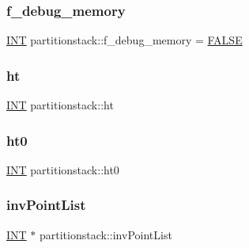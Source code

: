 \subsubsection{\texorpdfstring{f\+\_\+debug\+\_\+memory}{f\_debug\_memory}}
{\footnotesize\ttfamily \mbox{\hyperlink{galois_8h_a09fddde158a3a20bd2dcadb609de11dc}{I\+NT}} partitionstack\+::f\+\_\+debug\+\_\+memory = \mbox{\hyperlink{nauty_8h_aa93f0eb578d23995850d61f7d61c55c1}{F\+A\+L\+SE}}\hspace{0.3cm}{\ttfamily [static]}}

\mbox{\label{classpartitionstack_a1d846a0136d659f36ac51214e0fe14bc}} 
\subsubsection{\texorpdfstring{ht}{ht}}
{\footnotesize\ttfamily \mbox{\hyperlink{galois_8h_a09fddde158a3a20bd2dcadb609de11dc}{I\+NT}} partitionstack\+::ht}

\mbox{\label{classpartitionstack_a148b5b247cc3b8653d850f6b9b0fc883}} 
\subsubsection{\texorpdfstring{ht0}{ht0}}
{\footnotesize\ttfamily \mbox{\hyperlink{galois_8h_a09fddde158a3a20bd2dcadb609de11dc}{I\+NT}} partitionstack\+::ht0}

\mbox{\label{classpartitionstack_a34ffeed14cc871b5debc674b21bcff1f}} 
\subsubsection{\texorpdfstring{inv\+Point\+List}{invPointList}}
{\footnotesize\ttfamily \mbox{\hyperlink{galois_8h_a09fddde158a3a20bd2dcadb609de11dc}{I\+NT}} $\ast$ partitionstack\+::inv\+Point\+List}

\mbox{\label{classpartitionstack_a46993cfd38e5ad600ada089bc261cd24}} 
